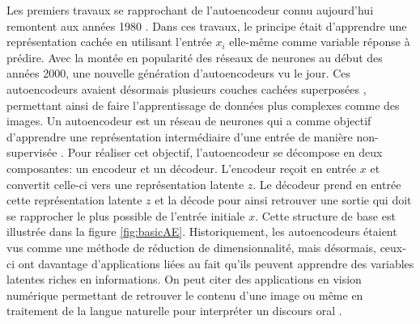 Les premiers travaux se rapprochant de l'autoencodeur connu aujourd'hui remontent aux années 1980 \citep{Rumelhart-1986}. Dans ces travaux, le principe était d'apprendre une représentation cachée en utilisant l'entrée $x_i$ elle-même comme variable réponse à prédire. Avec la montée en popularité des réseaux de neurones au début des années 2000, une nouvelle génération d'autoencodeurs \DIFdelbegin {}\DIFdelend \DIFaddbegin {}\DIFaddend vu le jour. Ces autoencodeurs avaient désormais plusieurs couches cachées superposées \citep{HintonSalakhutdinov2006b}, permettant ainsi de faire l'apprentissage de données plus complexes comme des images. Un autoencodeur est un réseau de neurones qui a comme objectif d'apprendre une représentation intermédiaire d'une entrée de manière non-supervisée \citep{Goodfellow-et-al-2016}. Pour réaliser cet objectif, l'autoencodeur se décompose en deux composantes: un encodeur et un décodeur. L'encodeur reçoit en entrée $x$ et convertit celle-ci vers une représentation latente $z$. Le décodeur prend en entrée cette représentation latente $z$ et la décode pour ainsi retrouver une sortie qui doit se rapprocher le plus possible de l'entrée initiale $x$. Cette structure de base est illustrée dans la figure \ref{fig:basicAE}. Historiquement, les autoencodeurs étaient vus comme une méthode de réduction de dimensionnalité, mais désormais, ceux-ci ont davantage d'applications liées au fait qu'ils peuvent apprendre des variables latentes riches en informations. On peut citer des applications en vision numérique permettant de retrouver le contenu d'une image \citep{conf/esann/KrizhevskyH11} ou même en traitement de la langue naturelle pour interpréter un discours oral \citep{inproceedings}. \newline

